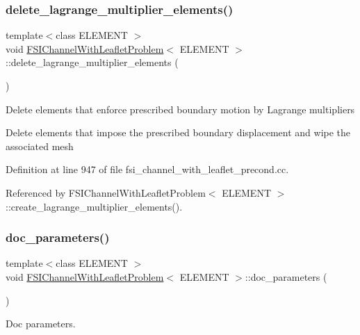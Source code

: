 \subsubsection{\texorpdfstring{delete\+\_\+lagrange\+\_\+multiplier\+\_\+elements()}{delete\_lagrange\_multiplier\_elements()}}
{\footnotesize\ttfamily template$<$class E\+L\+E\+M\+E\+NT $>$ \\
void \hyperlink{classFSIChannelWithLeafletProblem}{F\+S\+I\+Channel\+With\+Leaflet\+Problem}$<$ E\+L\+E\+M\+E\+NT $>$\+::delete\+\_\+lagrange\+\_\+multiplier\+\_\+elements (\begin{DoxyParamCaption}{ }\end{DoxyParamCaption})}

Delete elements that enforce prescribed boundary motion by Lagrange multipliers

Delete elements that impose the prescribed boundary displacement and wipe the associated mesh 

Definition at line 947 of file fsi\+\_\+channel\+\_\+with\+\_\+leaflet\+\_\+precond.\+cc.



Referenced by F\+S\+I\+Channel\+With\+Leaflet\+Problem$<$ E\+L\+E\+M\+E\+N\+T $>$\+::create\+\_\+lagrange\+\_\+multiplier\+\_\+elements().

\mbox{\label{classFSIChannelWithLeafletProblem_a27548bcf25ba14dca9f80ffcbc5792b0}} 
\subsubsection{\texorpdfstring{doc\+\_\+parameters()}{doc\_parameters()}}
{\footnotesize\ttfamily template$<$class E\+L\+E\+M\+E\+NT $>$ \\
void \hyperlink{classFSIChannelWithLeafletProblem}{F\+S\+I\+Channel\+With\+Leaflet\+Problem}$<$ E\+L\+E\+M\+E\+NT $>$\+::doc\+\_\+parameters (\begin{DoxyParamCaption}{ }\end{DoxyParamCaption})\hspace{0.3cm}{\ttfamily [inline]}}



Doc parameters. 



